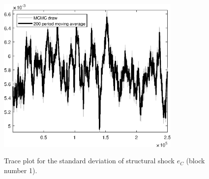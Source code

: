 \begin{figure}[H]
\centering
  \includegraphics[width=0.8\textwidth]{BRS_imp_mobility/graphs/TracePlot_SE_e_C_blck_1}\\
    \caption{Trace plot for the standard deviation of structural shock ${e_C}$ (block number 1).}
\end{figure}
